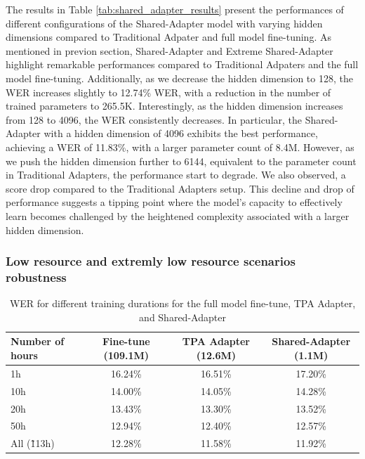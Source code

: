 The results in Table \ref{tab:shared_adapter_results} present the performances of different configurations of the Shared-Adapter model with varying hidden dimensions compared to Traditional Adpater and full model fine-tuning. As mentioned in previon section, Shared-Adapter and Extreme Shared-Adapter highlight remarkable performances compared to Traditional Adpaters and the full model fine-tuning. Additionally, as we decrease the hidden dimension to 128, the WER increases slightly to 12.74\% \ac{WER}, with a reduction in the number of trained parameters to 265.5K. Interestingly, as the hidden dimension increases from 128 to 4096, the \ac{WER} consistently decreases. In particular, the Shared-Adapter with a hidden dimension of 4096 exhibits the best performance, achieving a \ac{WER} of 11.83\%, with a larger parameter count of 8.4M. 
However, as we push the hidden dimension further to 6144, equivalent to the parameter count in Traditional Adapters, the performance start to degrade. We also observed, a score drop compared to the Traditional Adapters setup. This decline and drop of performance suggests a tipping point where the model's capacity to effectively learn becomes challenged by the heightened complexity associated with a larger hidden dimension. 


\subsubsection{Low resource and extremly low resource scenarios robustness}
\label{sec:hours_PETL}
\begin{table}[ht]
    \centering
    \begin{tabular}{l c c c}
        \hline
        Number of hours & Fine-tune (109.1M) & TPA Adapter (12.6M) & Shared-Adapter (1.1M) \\
        \hline
        1h & 16.24\% & 16.51\% & 17.20\% \\
        10h & 14.00\% & 14.05\% & 14.28\% \\
        20h & 13.43\% & 13.30\% & 13.52\% \\
        50h & 12.94\% & 12.40\% & 12.57\% \\
        All (\~113h) & 12.28\% & 11.58\% & 11.92\% \\
        \hline
    \end{tabular}
    \caption{WER for different training durations for the full model fine-tune, TPA Adapter, and Shared-Adapter}
    \label{tab:training_duration_results}
\end{table}

